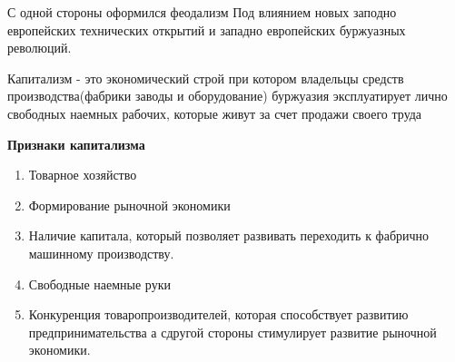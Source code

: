 \documentclass[a4paper]{article}
\begin{document}
С одной стороны оформился феодализм Под влиянием новых заподно европейских технических открытий и западно европейских буржуазных революций.

Капитализм - это экономический строй при котором владельцы средств производства(фабрики заводы и оборудование) буржуазия эксплуатирует лично свободных наемных рабочих, которые живут за счет продажи своего труда

\textbf{Признаки капитализма}
\begin{enumerate}
\item Товарное хозяйство
\item Формирование рыночной экономики
\item Наличие капитала, который позволяет развивать переходить к фабрично машинному производству.
\item Свободные наемные руки
\item Конкуренция товаропроизводителей, которая способствует развитию предпринимательства а сдругой стороны стимулирует развитие рыночной экономики.
\end{enumerate}
\end{document}
